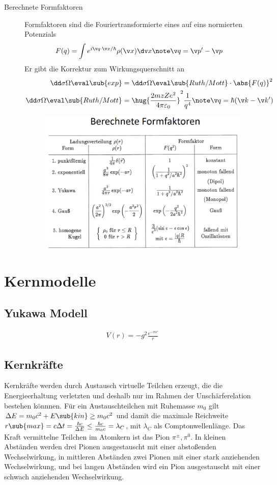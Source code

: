 \documentclass[twocolumn]{summery_4.1}
\begin{document}
\begin{description}
    \item[Berechnete Formfaktoren]
    Formfaktoren sind die Fouriertransformierte eines auf eins normierten Potenzials
    \begin{align*}
        F(q) &= \int e^{i \v q\cdot \v x / \hbar } \rho(\v x) \dv x\note \v q = \v p' - \v p
    \end{align*}
    Er gibt die Korrektur zum Wirkungsquerschnitt an
    \begin{align*}
        \dd\sigma\Omega\eval\sub{exp} &= \dd\sigma\Omega\eval\sub{Ruth/Mott} \cdot \abs{F(q)}^2\\
        \dd\sigma\Omega\eval\sub{Ruth/Mott} &= \hug{\frac{2m z Z e^2}{4\pi \varepsilon_0} }^2  \frac{1}{q^4}\note \v q = \hbar(\v k - \v k')
    \end{align*}
    \begin{figure}[H]
        \centering
        \includegraphics[width=.49\textwidth]{Tabelle_Streuung.png}
    \end{figure}
\end{description}

\section{Kernmodelle}
\subsection{Yukawa Modell}
\begin{align*}
    V(r) = -g^2 \frac{e^{-mr}}{r}
\end{align*}
\subsection{Kernkräfte}
Kernkräfte werden durch Austausch virtuelle Teilchen erzeugt, die die Energieerhaltung verletzten und deshalb nur im Rahmen der Unschärferelation bestehen könnnen. Für ein Austauschteilchen mit Ruhemasse \(m_0\) gilt
\(\Delta E = m_0 c^2 + E\sub{kin} \ge m_0 c^2\) und damit die maximale Reichweite
\(r\sub{max} = c\Delta t = \frac{\hbar c}{\Delta E} \le  \frac{\hbar c}{m_0 c} = \lambda_C\), mit \(\lambda_C\) als Comptonwellenlänge.  
Das Kraft vermittelne Teilchen im Atomkern ist das Pion \(\pi^\pm, \pi^0\).
In kleinen Abständen werden drei Pionen ausgestauscht mit einer abstoßenden Wechselwirkung, in mittleren Abständen zwei Pionen mit einer stark anziehenden Wechselwirkung, und bei langen Abständen wird ein Pion ausgestauscht mit einer schwach anziehenden Wechselwirkung.
\end{document}
